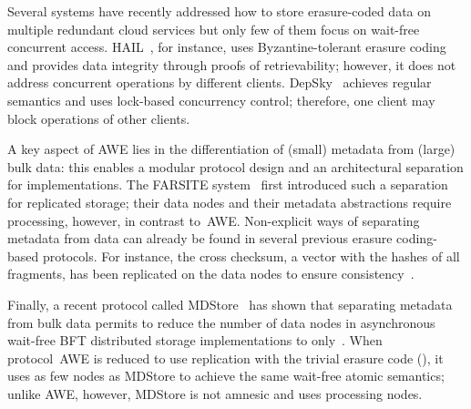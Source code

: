 \documentclass[oribibl]{llncs}
\theoremstyle{definition-boldhead}
\newcommand{\NAME}{AWE\xspace}
\newcommand{\nodes}{nodes\xspace}
\begin{document}
Several systems have recently addressed how to store erasure-coded
data on multiple redundant cloud services but only few of them focus
on wait-free concurrent access.  HAIL~\cite{bojuop09}, for instance,
uses Byzantine-tolerant erasure coding and provides data integrity
through proofs of retrievability; however, it does not address concurrent operations by different clients.  DepSky~\cite{bcqas11}
achieves regular semantics and uses lock-based concurrency control;
therefore, one client may block operations of other clients.

A key aspect of \NAME lies in the differentiation of (small) metadata
from (large) bulk data: this enables a modular protocol design and an
architectural separation for implementations.
The FARSITE system~\cite{abcccd02} first introduced such a separation
for replicated storage; their data \nodes and their metadata
abstractions require processing, however, in contrast to~\NAME. Non-explicit ways of separating metadata from data can already be
found in several previous erasure coding-based protocols.  For
instance, the cross checksum, a vector with the hashes of all 
fragments, has been replicated on the data nodes to ensure
consistency~\cite{gwgr04,cactes06}.

Finally, a recent protocol called MDStore~\cite{cadovu13} has shown
that separating metadata from bulk data permits to reduce the number
of data \nodes in asynchronous wait-free BFT distributed storage
implementations to only~.  When protocol~\NAME is reduced to use
replication with the trivial erasure code (), it uses as few
\nodes as MDStore to achieve the same wait-free atomic semantics;
unlike \NAME, however, MDStore is not amnesic and uses processing
\nodes.


\newcommand{\Y}{\ensuremath{\checkmark}}
\newcommand{\T}{\ensuremath{^*}}
\end{document}
